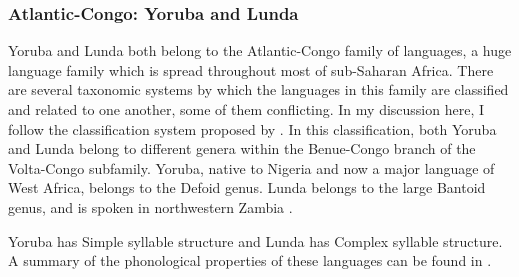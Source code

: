 \subsubsection{{Atlantic-Congo:} {Yoruba} {and} {Lunda}}\label{sec:8.4.3.4}

  Yoruba and Lunda both belong to the Atlantic-Congo family of languages, a huge language family which is spread throughout most of sub-Saharan Africa. There are several taxonomic systems by which the languages in this family are classified and related to one another, some of them conflicting. In my discussion here, I follow the classification system proposed by \citet{Williamson1989}. In this classification, both Yoruba and Lunda belong to different genera within the Benue-Congo branch of the Volta-Congo subfamily. Yoruba, native to Nigeria and now a major language of West Africa, belongs to the Defoid genus. Lunda belongs to the large Bantoid genus, and is spoken in northwestern Zambia \citep{Kawasha2003}.

  Yoruba has Simple syllable structure and Lunda has Complex syllable structure. A summary of the phonological properties of these languages can be found in .

